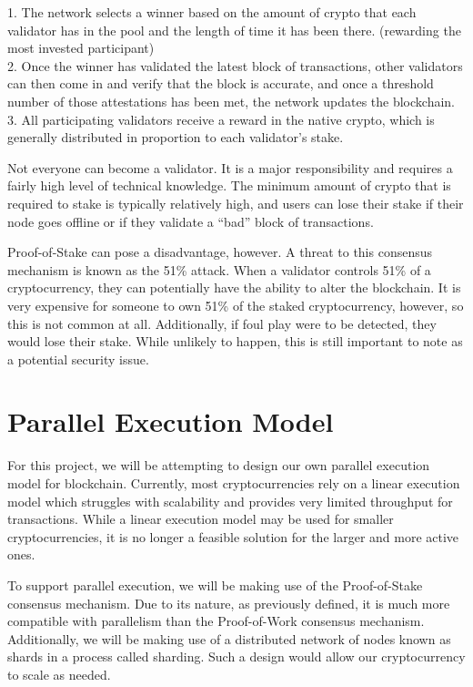     1. The network selects a winner based on the amount of crypto that each validator has in the pool and the length of time it has been there. (rewarding the most invested participant)\\
    2. Once the winner has validated the latest block of transactions, other validators can then come in and verify that the block is accurate, and once a threshold number of those attestations has been met, the network updates the blockchain.\\
    3. All participating validators receive a reward in the native crypto, which is generally distributed in proportion to each validator’s stake.
	
Not everyone can become a validator. It is a major responsibility and requires a fairly high level of technical knowledge. The minimum amount of crypto that is required to stake is typically relatively high, and users can lose their stake if their node goes offline or if they validate a “bad” block of transactions. 

Proof-of-Stake can pose a disadvantage, however. A threat to this consensus mechanism is known as the 51\% attack. When a validator controls 51\% of a cryptocurrency, they can potentially have the ability to alter the blockchain. It is very expensive for someone to own 51\% of the staked cryptocurrency, however, so this is not common at all. Additionally, if foul play were to be detected, they would lose their stake. While unlikely to happen, this is still important to note as a potential security issue.


\section{Parallel Execution Model}

For this project, we will be attempting to design our own parallel execution model for blockchain. Currently, most cryptocurrencies rely on a linear execution model which struggles with scalability and provides very limited throughput for transactions. While a linear execution model may be used for smaller cryptocurrencies, it is no longer a feasible solution for the larger and more active ones.

To support parallel execution, we will be making use of the Proof-of-Stake consensus mechanism. Due to its nature, as previously defined, it is much more compatible with parallelism than the Proof-of-Work consensus mechanism. Additionally, we will be making use of a distributed network of nodes known as shards in a process called sharding. Such a design would allow our cryptocurrency to scale as needed.

